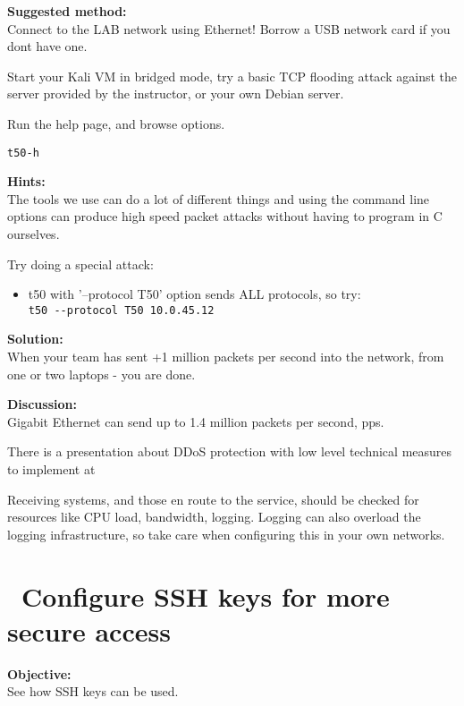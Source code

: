 \documentclass[a4paper,11pt,notitlepage]{report}
\begin{document}
{\bf Suggested method:}\\
Connect to the LAB network using Ethernet! Borrow a USB network card if you dont have one.

Start your Kali VM in bridged mode, try a basic TCP flooding attack against the server provided by the instructor, or your own Debian server.

Run the help page, and browse options.
\begin{alltt}\footnotesize
t50 -h
\end{alltt}





{\bf Hints:}\\
The tools we use can do a lot of different things and using the command line options can produce high speed packet attacks without having to program in C ourselves.

Try doing a special attack:
\begin{itemize}
\item t50 with '--protocol T50' option sends ALL protocols, so try:\\
\verb+t50 --protocol T50 10.0.45.12+
\end{itemize}


{\bf Solution:}\\
When your team has sent +1 million packets per second into the network, from one or two laptops - you are done.

{\bf Discussion:}\\
Gigabit Ethernet can send up to 1.4 million packets per second, pps.

There is a presentation about DDoS protection with low level technical measures to implement at\\
{\footnotesize {}}

Receiving systems, and those en route to the service, should be checked for resources like CPU load, bandwidth, logging. Logging can also overload the logging infrastructure, so take care when configuring this in your own networks.



\chapter{\faInfoCircle\ Configure SSH keys for more secure access}
\label{ex:config-ssh-keys}

{\bf Objective:}\\
See how SSH keys can be used.
\end{document}
